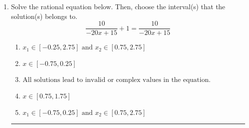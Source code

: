 \documentclass[14pt]{extbook}
\newcommand{\litem}[1]{\item#1\hspace*{-1cm}\rule{\textwidth}{0.4pt}}
\begin{document}
\begin{enumerate}
{\begin{enumerate}[label=\Alph*.]
\end{enumerate} }
\litem{
Solve the rational equation below. Then, choose the interval(s) that the solution(s) belongs to.\[ \frac{10}{-20x + 15} + 1 = \frac{10}{-20x + 15} \]\begin{enumerate}[label=\Alph*.]
\item \( x_1 \in [-0.25, 2.75] \text{ and } x_2 \in [0.75,2.75] \)
\item \( x \in [-0.75,0.25] \)
\item \( \text{All solutions lead to invalid or complex values in the equation.} \)
\item \( x \in [0.75,1.75] \)
\item \( x_1 \in [-0.75, 0.25] \text{ and } x_2 \in [0.75,2.75] \)

\end{enumerate} }
\end{enumerate}
\end{document}

